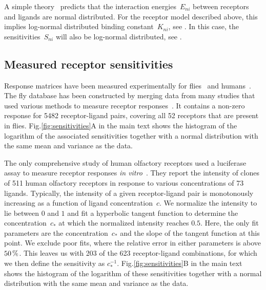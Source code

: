 \documentclass[twocolumn, superscriptaddress]{revtex4}
\renewcommand{\figref}[1]{Fig.\nolinebreak[4]\hspace{0.25em}\nolinebreak[4]\ref{#1}}
\begin{document}
A simple theory~\cite{Lancet1993} predicts that the interaction energies~$E_{ni}$ between receptors and ligands are normal distributed.
For the receptor model described above, this implies log-normal distributed binding constant~$K_{ni}$, see .
In this case, the sensitivities~$S_{ni}$ will also be log-normal distributed, see .

\subsection{Measured receptor sensitivities}
Response matrices have been measured experimentally for flies~\cite{Muench2015} and humans~\cite{Mainland2015}.
The fly database has been constructed by merging data from many studies that used various methods to measure receptor responses~\cite{Muench2015}.
It contains a non-zero response for 5482 receptor-ligand pairs, covering all 52 receptors that are present in flies.
\figref{fig:sensitivities}A in the main text shows the histogram of the logarithm of the associated sensitivities together with a normal distribution with the same mean and variance as the data.

The only comprehensive study of human olfactory receptors used a luciferase assay to measure receptor responses \textit{in vitro}~\cite{Mainland2015}.
They report the intensity of clones of 511 human olfactory receptors in response to various concentrations of 73 ligands.
Typically, the intensity of a given receptor-ligand pair is monotonously increasing as a function of ligand concentration~$c$.
We normalize the intensity to lie between $0$ and $1$ and fit a hyperbolic tangent function to determine the concentration~$c_*$ at which the normalized intensity reaches $0.5$.
Here, the only fit parameters are the concentration~$c_*$  and the slope of the tangent function at this point.
We exclude poor fits, where the relative error in either parameters is above $\unit[50]{\%}$.
This leaves us with 203 of the 623 receptor-ligand combinations, for which we then define the sensitivity as $c_*^{-1}$.
\figref{fig:sensitivities}B in the main text shows the histogram of the logarithm of these sensitivities together with a normal distribution with the same mean and variance as the data.
\end{document}
